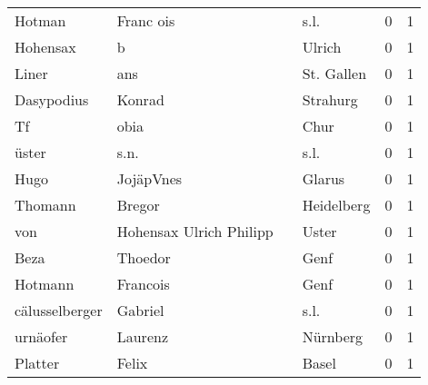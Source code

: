\begin{center}
\begin{tiny}
\begin{longtabu}{llllrr}
                   Hotman &                          Franc ois &             &                                        s.l. &          0 &         1 \\
                 Hohensax &                                  b &             &                                      Ulrich &          0 &         1 \\
                    Liner &                                ans &             &                                  St. Gallen &          0 &         1 \\
               Dasypodius &                             Konrad &             &                                    Strahurg &          0 &         1 \\
                       Tf &                               obia &             &                                        Chur &          0 &         1 \\
                    üster &                               s.n. &             &                                        s.l. &          0 &         1 \\
                     Hugo &                          JojäpVnes &             &                                      Glarus &          0 &         1 \\
                  Thomann &                             Bregor &             &                                  Heidelberg &          0 &         1 \\
                      von &            Hohensax Ulrich Philipp &             &                                       Uster &          0 &         1 \\
                     Beza &                            Thoedor &             &                                        Genf &          0 &         1 \\
                  Hotmann &                           Francois &             &                                        Genf &          0 &         1 \\
           cälusselberger &                            Gabriel &             &                                        s.l. &          0 &         1 \\
                 urnäofer &                            Laurenz &             &                                    Nürnberg &          0 &         1 \\
                  Platter &                              Felix &             &                                       Basel &          0 &         1 \\

\end{longtabu}
\end{tiny}
\end{center}
